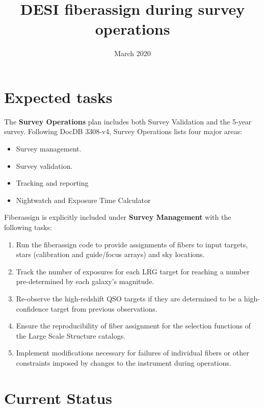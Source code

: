 \documentclass{article}
\title{DESI fiberassign during survey operations}
\date{March 2020}
\begin{document}
\maketitle

\section{Expected tasks}


The \textbf{Survey Operations} plan includes both Survey Validation
and the 5-year survey.  Following DocDB 3308-v4, Survey Operations
lists four major areas:

\begin{itemize}
    \item Survey management.
    \item Survey validation.
    \item Tracking and reporting
    \item Nightwatch and Exposure Time Calculator
\end{itemize}

Fiberassign is explicitly included under  \textbf{Survey Management}
with the following tasks:

\begin{enumerate}
\item Run the fiberassign code to provide assignments of fibers to
  input targets, stars (calibration and guide/focus arrays) and sky
  locations. 

\item Track the number of exposures for each LRG target for
  reaching a number pre-determined by each galaxy’s magnitude. 

\item Re-observe the high-redshift QSO targets if they are
  determined to be a high-confidence target from previous observations.

\item Ensure the reproducibility of fiber assignment for the
  selection functions of the Large Scale Structure catalogs.

\item Implement modifications necessary for failures of individual
  fibers or other constraints imposed by changes to the instrument
  during operations. 
\end{enumerate}

\section{Current Status}
\end{document}
